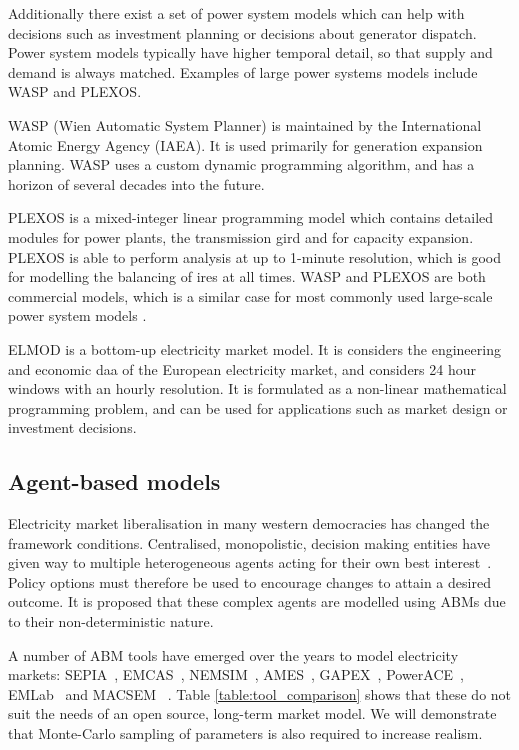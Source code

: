 Additionally there exist a set of power system models which can help with decisions such as investment planning or decisions about generator dispatch. Power system models typically have higher temporal detail, so that supply and demand is always matched. Examples of large power systems models include WASP and PLEXOS.

WASP (Wien Automatic System Planner) is maintained by the International Atomic Energy Agency (IAEA). It is used primarily for generation expansion planning. WASP uses a custom dynamic programming algorithm, and has a horizon of several decades into the future. 

PLEXOS is a mixed-integer linear programming model which contains detailed modules for power plants, the transmission gird and for capacity expansion. PLEXOS is able to perform analysis at up to 1-minute resolution, which is good for modelling the balancing of \acrshort{ires} at all times. WASP and PLEXOS are both commercial models, which is a similar case for most commonly used large-scale power system models \cite{Pfenninger2014}.

ELMOD is a bottom-up electricity market model. It is considers the engineering and economic daa of the European electricity market, and considers 24 hour windows with an hourly resolution. It is formulated as a non-linear mathematical programming problem, and can be used for applications such as market design or investment decisions.


\subsection{Agent-based models}

Electricity market liberalisation in many western democracies has changed the framework conditions. Centralised, monopolistic, decision making entities have given way to multiple heterogeneous agents acting for their own best interest~\cite{Most2010}. Policy options must therefore be used to encourage changes to attain a desired outcome. It is proposed that these complex agents are modelled using ABMs due to their non-deterministic nature. 

A number of ABM tools have emerged over the years to model electricity markets: SEPIA~\cite{Harp2000}, EMCAS~\cite{Conzelmann}, NEMSIM~\cite{Batten2006}, AMES~\cite{Sun2007}, GAPEX~\cite{Cincotti2013}, PowerACE~\cite{Rothengatter2007}, EMLab~\cite{Chappin2017} and MACSEM ~\cite{Praca2003}. Table \ref{table:tool_comparison} shows that these do not suit the needs of an open source, long-term market model. We will demonstrate that Monte-Carlo sampling of parameters is also required to increase realism.

